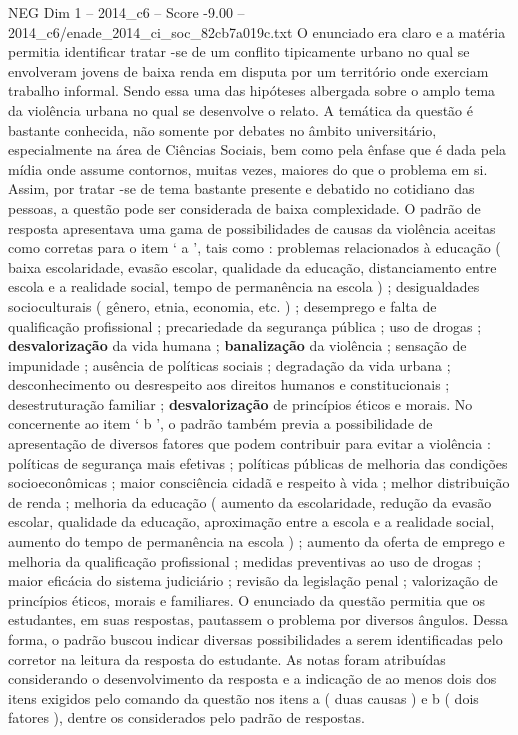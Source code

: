 \begin{textsample}{NEG Dim 1 – 2014\_c6 – Score -9.00 – 2014\_c6/enade\_2014\_ci\_soc\_82cb7a019c.txt}
O enunciado era claro e a matéria permitia identificar tratar -se de um conflito tipicamente urbano no qual se envolveram jovens de baixa renda em disputa por um território onde exerciam trabalho informal.
Sendo essa uma das hipóteses albergada sobre o amplo tema da violência urbana no qual se desenvolve o relato.
A temática da questão é bastante conhecida, não somente por debates no âmbito universitário, especialmente na área de Ciências Sociais, bem como pela ênfase que é dada pela mídia onde assume contornos, muitas vezes, maiores do que o problema em si.
Assim, por tratar -se de tema bastante presente e debatido no cotidiano das pessoas, a questão pode ser considerada de baixa complexidade.
O padrão de resposta apresentava uma gama de possibilidades de causas da violência aceitas como corretas para o item ‘ a ’, tais como : problemas relacionados à educação ( baixa escolaridade, evasão escolar, qualidade da educação, distanciamento entre escola e a realidade social, tempo de permanência na escola ) ; desigualdades socioculturais ( gênero, etnia, economia, etc. ) ; desemprego e falta de qualificação profissional ; precariedade da segurança pública ; uso de drogas ; \textbf{desvalorização} da vida humana ; \textbf{banalização} da violência ; sensação de impunidade ; ausência de políticas sociais ; degradação da vida urbana ; desconhecimento ou desrespeito aos direitos humanos e constitucionais ; desestruturação familiar ; \textbf{desvalorização} de princípios éticos e morais.
No concernente ao item ‘ b ’, o padrão também previa a possibilidade de apresentação de diversos fatores que podem contribuir para evitar a violência : políticas de segurança mais efetivas ; políticas públicas de melhoria das condições socioeconômicas ; maior consciência cidadã e respeito à vida ; melhor distribuição de renda ; melhoria da educação ( aumento da escolaridade, redução da evasão escolar, qualidade da educação, aproximação entre a escola e a realidade social, aumento do tempo de permanência na escola ) ; aumento da oferta de emprego e melhoria da qualificação profissional ; medidas preventivas ao uso de drogas ; maior eficácia do sistema judiciário ; revisão da legislação penal ; valorização de princípios éticos, morais e familiares.
O enunciado da questão permitia que os estudantes, em suas respostas, pautassem o problema por diversos ângulos.
Dessa forma, o padrão buscou indicar diversas possibilidades a serem identificadas pelo corretor na leitura da resposta do estudante.
As notas foram atribuídas considerando o desenvolvimento da resposta e a indicação de ao menos dois dos itens exigidos pelo comando da questão nos itens a ( duas causas ) e b ( dois fatores ), dentre os considerados pelo padrão de respostas.

\end{textsample}
